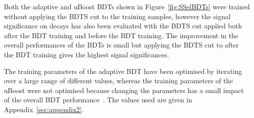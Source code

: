 Both the adaptive and uBoost BDTs shown in Figure~\ref{fig:SSelBDTs} were trained without applying the BDTS cut to the training samples, however the signal significance on \bhh decays has also been evaluated with the BDTS cut applied both after the BDT training and before the BDT training. The improvement in the overall performances of the BDTs is small but applying the BDTS cut to \bhh after the BDT training gives the highest signal significances. 

The training parameters of the adaptive BDT have been optimised by iterating over a large range of different values, whereas the training parameters of the uBoost were not optimised because changing the parameters has a small impact of the overall BDT performance~\cite{Stevens:2013dya}. The values used are given in Appendix~\ref{sec:appendix2}. 

